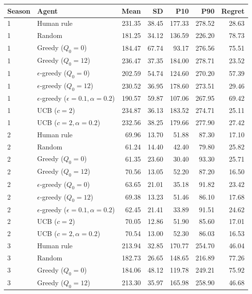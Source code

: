 \documentclass[11pt,a4paper]{article}
\begin{document}
\begin{table}[H]\centering\scriptsize
\begin{tabular}{llrrrrr}\toprule
Season & Agent & Mean & SD & P10 & P90 & Regret\\\midrule
1 & Human rule & 231.35 & 38.45 & 177.33 & 278.52 & 28.63\\
1 & Random & 181.25 & 34.12 & 136.59 & 226.20 & 78.73\\
1 & Greedy ($Q_0=0$) & 184.47 & 67.74 & 93.17 & 276.56 & 75.51\\
1 & Greedy ($Q_0=12$) & 236.47 & 37.35 & 184.00 & 278.71 & 23.52\\
1 & $\epsilon$-greedy ($Q_0=0$) & 202.59 & 54.74 & 124.60 & 270.20 & 57.39\\
1 & $\epsilon$-greedy ($Q_0=12$) & 230.52 & 36.95 & 178.60 & 273.51 & 29.46\\
1 & $\epsilon$-greedy ($\epsilon=0.1,\alpha=0.2$) & 190.57 & 59.87 & 107.06 & 267.95 & 69.42\\
1 & UCB ($c=2$) & 234.87 & 36.13 & 183.52 & 274.71 & 25.11\\
1 & UCB ($c=2,\alpha=0.2$) & 232.56 & 38.25 & 179.66 & 277.90 & 27.42\\\midrule
2 & Human rule & 69.96 & 13.70 & 51.88 & 87.30 & 17.10\\
2 & Random & 61.24 & 14.40 & 42.40 & 79.80 & 25.82\\
2 & Greedy ($Q_0=0$) & 61.35 & 23.60 & 30.40 & 93.30 & 25.71\\
2 & Greedy ($Q_0=12$) & 70.56 & 13.05 & 52.20 & 87.20 & 16.50\\
2 & $\epsilon$-greedy ($Q_0=0$) & 63.65 & 21.01 & 35.18 & 91.82 & 23.42\\
2 & $\epsilon$-greedy ($Q_0=12$) & 69.38 & 13.23 & 51.46 & 86.10 & 17.68\\
2 & $\epsilon$-greedy ($\epsilon=0.1,\alpha=0.2$) & 62.45 & 21.41 & 33.89 & 91.51 & 24.62\\
2 & UCB ($c=2$) & 70.05 & 12.86 & 51.90 & 85.60 & 17.01\\
2 & UCB ($c=2,\alpha=0.2$) & 70.54 & 13.00 & 52.30 & 86.03 & 16.53\\\midrule
3 & Human rule & 213.94 & 32.85 & 170.77 & 254.70 & 46.04\\
3 & Random & 182.73 & 26.65 & 148.65 & 216.89 & 77.26\\
3 & Greedy ($Q_0=0$) & 184.06 & 48.12 & 119.78 & 249.21 & 75.92\\
3 & Greedy ($Q_0=12$) & 213.30 & 35.97 & 165.98 & 258.90 & 46.68\\

\end{tabular}
\end{table}
\end{document}

